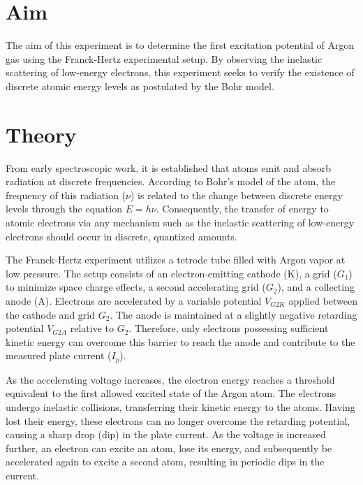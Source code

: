 \documentclass[../main.tex]{subfiles}
\begin{document}
\setcounter{page}{37}

\vspace*{1cm}
\section{Aim}
The aim of this experiment is to determine the first excitation potential of Argon gas using the Franck-Hertz experimental setup. By observing the inelastic scattering of low-energy electrons, this experiment seeks to verify the existence of discrete atomic energy levels as postulated by the Bohr model.

\section{Theory}
From early spectroscopic work, it is established that atoms emit and absorb radiation at discrete frequencies. According to Bohr's model of the atom, the frequency of this radiation ($\nu$) is related to the change between discrete energy levels through the equation $E=h\nu$. Consequently, the transfer of energy to atomic electrons via any mechanism such as the inelastic scattering of low-energy electrons should occur in discrete, quantized amounts.

The Franck-Hertz experiment utilizes a tetrode tube filled with Argon vapor at low pressure. The setup consists of an electron-emitting cathode (K), a grid ($G_1$) to minimize space charge effects, a second accelerating grid ($G_2$), and a collecting anode (A). Electrons are accelerated by a variable potential $V_{G2K}$ applied between the cathode and grid $G_2$. The anode is maintained at a slightly negative retarding potential $V_{G2A}$ relative to $G_2$. Therefore, only electrons possessing sufficient kinetic energy can overcome this barrier to reach the anode and contribute to the measured plate current ($I_p$).

As the accelerating voltage increases, the electron energy reaches a threshold equivalent to the first allowed excited state of the Argon atom. The electrons undergo inelastic collisions, transferring their kinetic energy to the atoms. Having lost their energy, these electrons can no longer overcome the retarding potential, causing a sharp drop (dip) in the plate current. As the voltage is increased further, an electron can excite an atom, lose its energy, and subsequently be accelerated again to excite a second atom, resulting in periodic dips in the current.
\end{document}
